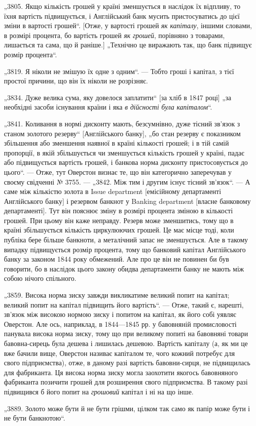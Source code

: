 „3805. Якщо кількість грошей у країні зменшується в наслідок
їх відпливу, то їхня вартість підвищується, і Англійський банк
мусить пристосуватись до цієї зміни в вартості грошей“. [Отже, у вартості грошей \emph{як капіталу}, іншими
словами, в розмірі процента, бо вартість грошей \emph{як грошей}, порівняно з товарами,
лишається та сама, що й раніше.] „Технічно це виражають так,
що банк підвищує розмір процента“.

„3819. Я ніколи не змішую їх одне з одним“. — Тобто гроші
і капітал, з тієї простої причини, що він їх ніколи не розрізняє.

„3834. Дуже велика сума, яку довелося заплатити“ [за хліб
в 1847 році] „за необхідні засоби існування країни і яка \emph{в дійсності була капіталом}“.

„3841. Коливання в нормі дисконту мають, безсумнівно, дуже
тісний зв’язок з станом золотого резерву“ [Англійського
банку], „бо стан резерву є показником збільшення або зменшення
наявної в країні кількості грошей; і в тій самій пропорції, в якій
збільшується чи зменшується кількість грошей у країні, падає або
підвищується вартість грошей, і банкова норма дисконту пристосовується до цього“. — Отже, тут
Оверстон визнає те, що він
категорично заперечував у своєму свідченні № 3755. — „3842. Між
тим і другим існує тісний зв’язок“. — А саме між кількістю золота
в Issue department [емісійному департаменті Англійського банку]
і резервом банкнот у Banking department [власне банковому департаменті]. Тут він пояснює зміну в
розмірі процента зміною в кількості грошей. При цьому він каже неправду. Резерв може зменшитись,
тому що в країні збільшується кількість циркулюючих грошей.
Це має місце тоді, коли публіка бере більше банкноти, а металічний запас не зменшується. Але в
такому випадку підвищується
розмір процента, тому що банковий капітал Англійського банку
за законом 1844 року обмежений. Але про це він не повинен
би був говорити, бо в наслідок цього закону обидва департаменти банку не мають між собою нічого
спільного.

„3859. Висока норма зиску завжди викликатиме великий попит
на капітал; великий попит на капітал підвищить його вартість“. — Отже, такий є, нарешті, зв’язок між
високою нормою
зиску і попитом на капітал, як його собі уявляє Оверстон. Але
ось, наприклад, в 1844—1845 рр. у бавовняній промисловості
панувала висока норма зиску, тому що при великому попиті на
бавовняні товари бавовна-сирець була дешева і лишилась дешевою. Вартість капіталу (а, як ми це вже
бачили вище, Оверстон називає капіталом те, чого кожний потребує для свого
підприємства), отже, в даному разі вартість бавовни-сирця, не
підвищилась для фабриканта. Ця висока норма зиску могла
заохотити якогось бавовняного фабриканта позичити грошей для
розширення свого підприємства. В такому разі підвищився б його
попит на \emph{грошовий} капітал і ні на що інше.

„3889. Золото може бути й не бути грішми, цілком так само
як папір може бути і не бути банкнотою“.
